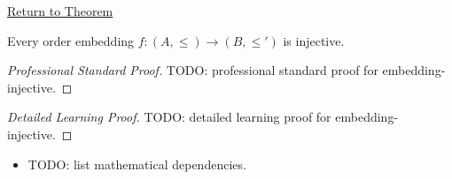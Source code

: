 \newpage
{}
\label{prf:embedding-injective}

\begin{remark*}[Return]
\hyperref[prop:embedding-injective]{Return to Theorem}
\end{remark*}

\begin{proposition*}
Every order embedding $f : (A, \leq) \to (B, \leq')$ is injective.
\end{proposition*}

\begin{proof}[Professional Standard Proof]
\LRAProofBodyStart
TODO: professional standard proof for embedding-injective.
\end{proof}

\begin{proof}[Detailed Learning Proof]
\LRAProofBodyStart
TODO: detailed learning proof for embedding-injective.
\end{proof}

\begin{remark*}
\end{remark*}

\begin{dependencies}
\begin{itemize}
  \item TODO: list mathematical dependencies.
\end{itemize}
\end{dependencies}

\clearpage
